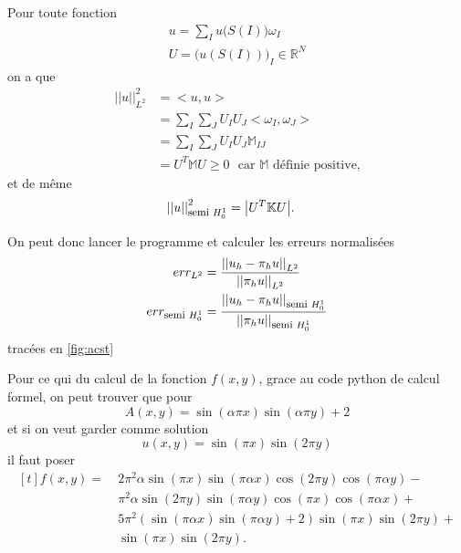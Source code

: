 \documentclass[11pt]{article}
\newcommand{\smbox}[1]{\mbox{\footnotesize #1}}
\newcommand{\R}{\mathbb{R}}
\newcommand{\K}{\mathbb{K}}
\newcommand{\M}{\mathbb{M}}
\newcommand{\ms}{~~~}
\newcommand{\norm}[1]{\left|\left|#1\right|\right|}
\begin{document}
Pour toute fonction
\begin{align}
  u = \sum_I u\big(S(I)\big) \omega_I \\
  U = \big(u(S(I))\big)_I \in \R^{ N}
\end{align}
on a que
\begin{align}
  \norm{u}_{L^2}^2 &= \big<u, u\big> \\
                   &= \sum_I \sum_J U_I U_J \big< \omega_I, \omega_J\big> \\
                   &= \sum_I \sum_J U_I U_J \M_{IJ} \\
                   &= U^T \M U \geq 0 \ms \mbox{car $\M$ définie positive,}
\end{align}
et de même
\begin{align}
  \norm{u}_{\smbox{semi~} H^1_0}^2 &= \big|U^T \K U \big|.
\end{align}

On peut donc lancer le programme et calculer les erreurs normalisées
\begin{align}
  err_{L^2} &= \frac{\norm{u_h-\pi_h u}_{L^2}}{\norm{\pi_h u}_{L^2}} \\
  err_{\smbox{semi~} H^1_0} &= \frac{\norm{u_h-\pi_h u}_{\smbox{semi~}H^1_0}}{\norm{\pi_h u}_{\smbox{semi~}H^1_0}} 
\end{align}
tracées en \autoref{fig:acst}

Pour ce qui du calcul de la fonction $f(x,y)$, grace au code python de calcul formel, on peut trouver que pour
\begin{equation}
  A(x,y)= \sin(\alpha \pi x)\sin(\alpha \pi y) + 2
\end{equation}
et si on veut garder comme solution
\begin{equation}
  u(x,y)=\sin(\pi x)\sin(2\pi y)
\end{equation}
il faut poser
\begin{equation}
  \begin{aligned}[t]
    f(x,y) =~& 2 \pi^2 \alpha \sin(\pi x) \sin(\pi \alpha x) \cos(2 \pi y) \cos(\pi \alpha y) - \\
    &\pi^2 \alpha \sin(2 \pi y) \sin(\pi \alpha y) \cos(\pi x) \cos(\pi \alpha x) + \\
    &5 \pi^2 (\sin(\pi \alpha x) \sin(\pi \alpha y) + 2) \sin(\pi x) \sin(2 \pi y) + \\
    &\sin(\pi x) \sin(2 \pi y).
  \end{aligned}
\end{equation}
\end{document}
